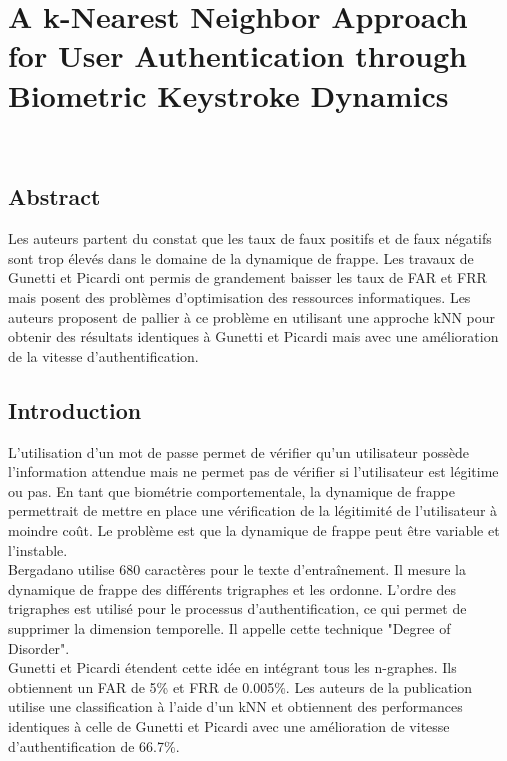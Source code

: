 \section{A k-Nearest Neighbor Approach for User Authentication through Biometric Keystroke Dynamics\cite{Hu2008}}

\\

\subsection{Abstract}

Les auteurs partent du constat que les taux de faux positifs et de faux négatifs sont trop élevés dans le domaine de la dynamique de frappe. Les travaux de Gunetti et Picardi ont permis de grandement baisser les taux de FAR et FRR mais posent des problèmes d'optimisation des ressources informatiques. Les auteurs proposent de pallier à ce problème en utilisant une approche kNN pour obtenir des résultats identiques à Gunetti et Picardi mais avec une amélioration de la vitesse d'authentification.\\

\subsection{Introduction}

L'utilisation d'un mot de passe permet de vérifier qu'un utilisateur possède l'information attendue mais ne permet pas de vérifier si l'utilisateur est légitime ou pas. En tant que biométrie comportementale, la dynamique de frappe permettrait de mettre en place une vérification de la légitimité de l'utilisateur à moindre coût. Le problème est que la dynamique de frappe peut être variable et l'instable.\\

Bergadano utilise 680 caractères pour le texte d'entraînement. Il mesure la dynamique de frappe des différents trigraphes et les ordonne. L'ordre des trigraphes est utilisé pour le processus d'authentification, ce qui permet de supprimer la dimension temporelle. Il appelle cette technique "Degree of Disorder".\\

Gunetti et Picardi étendent cette idée en intégrant tous les n-graphes. Ils obtiennent un FAR de 5\% et FRR de 0.005\%. Les auteurs de la publication utilise une classification à l'aide d'un kNN et obtiennent des performances identiques à celle de Gunetti et Picardi avec une amélioration de vitesse d'authentification de 66.7\%.

